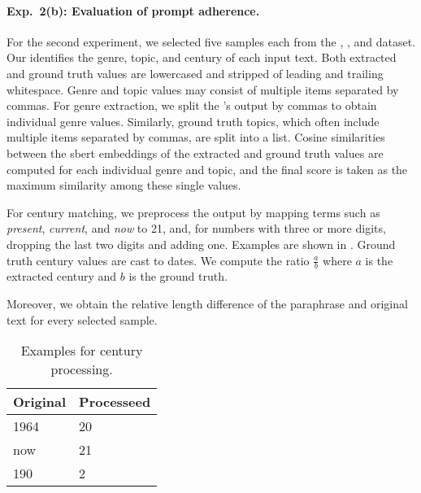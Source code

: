 \paragraph{Exp.\ 2(b): Evaluation of prompt adherence.}
For the second experiment, we selected five samples each from the \dataBlog{}, \dataGutenberg{}, and \dataStudent{} dataset. 
Our \pextractor{} identifies the genre, topic, and century of each input text. 
Both extracted and ground truth values are lowercased and stripped of leading and trailing whitespace. 
Genre and topic values may consist of multiple items separated by commas. 
For genre extraction, we split the \pextractor{}'s output by commas to obtain individual genre values. 
Similarly, ground truth topics, which often include multiple items separated by commas, are split into a list. 
Cosine similarities between the \ac{sbert} embeddings of the extracted and ground truth values are computed for each individual genre and topic, and the final score is taken as the maximum similarity among these single values. 

For century matching, we preprocess the \pextractor{} output by mapping terms such as \textit{present}, \textit{current}, and \textit{now} to 21, and, for numbers with three or more digits, dropping the last two digits and adding one. 
Examples are shown in . 
Ground truth century values are cast to dates.
We compute the ratio $\frac{a}{b}$ where $a$ is the extracted century and $b$ is the ground truth.

Moreover, we obtain the relative length difference of the paraphrase and original text for every selected sample. 

\begin{table}[h]
\centering
\caption{Examples for century processing.}
\label{tab:examples_extract_century}
\begin{tabular}{@{}ll@{}}
    \toprule
\textbf{Original} & \textbf{Processeed} \\
\midrule
1964              & 20                  \\
now               & 21                  \\
190               & 2     \\
\bottomrule             
\end{tabular}%
\end{table}


